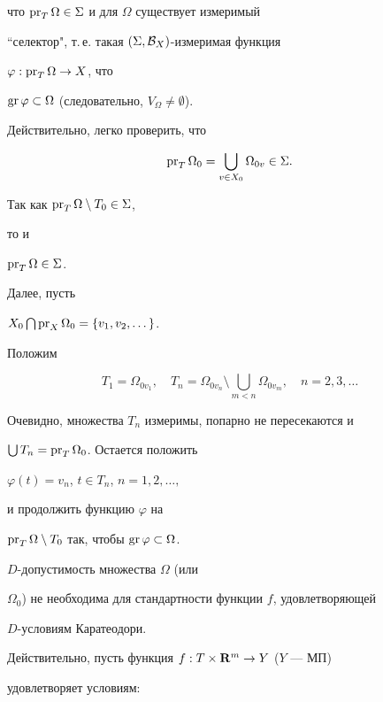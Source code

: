 что $\operatorname{pr}_T\Omega\in\Sigma$ и для $\Omega$ существует измеримый


``селектор", т.\,е. такая $(\Sigma,{\cal B}_X)$-измеримая функция


$\varphi:\operatorname{pr}_T\Omega\to X$, что


$\operatorname{gr}\varphi\subset\Omega$ (следовательно, $V_\Omega\ne\emptyset$).





Действительно, легко проверить, что


$$


\pr_T\Omega_0=\bigcup\limits_{v\in X_0}\Omega_{0v}\in\Sigma.


$$


Так как $\operatorname{pr}_T\Omega\setminus T_0\in\Sigma$,


то и


$\operatorname{pr}_T\Omega\in\Sigma$.


Далее, пусть


$X_0\bigcap\operatorname{pr}_X\Omega_0=\{v_1,v_2,\dotsc\}$.


Положим


$$


T_1=\Omega_{0v_1}, \quad T_n=\Omega_{0v_n}\setminus\bigcup_{m<n}


\Omega_{0v_m}, \quad n=2,3,\dotsc


$$


Очевидно, множества $T_n$ измеримы, попарно не пересекаются и


$\bigcup T_n=\operatorname{pr}_T\Omega_0$. Остается положить


$\varphi(t)=v_n$, $t\in T_n$, $n=1,2,\dotsc,$


и продолжить функцию $\varphi$ на


$\operatorname{pr}_T\Omega\setminus T_0$ так, чтобы $\operatorname{gr}\varphi\subset\Omega$.





\begin{notes} $D$-допустимость множества $\Omega$ (или


$\Omega_0$) не необходима для стандартности функции $f$, удовлетворяющей


$D$-условиям Каратеодори.


\end{notes}





Действительно, пусть функция $f:T\times\bold{R}^m\to Y$ ($Y$ --- МП)


удовлетворяет условиям:\linebreak


